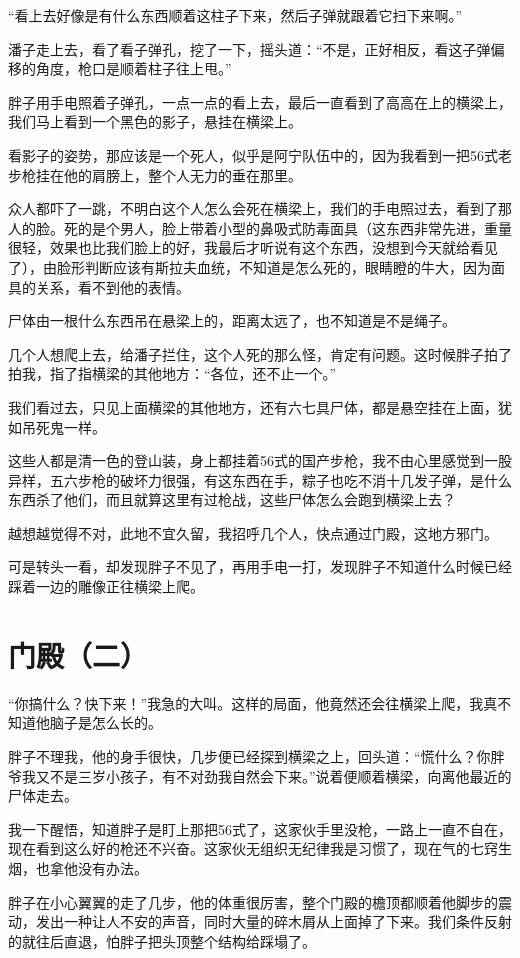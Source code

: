“看上去好像是有什么东西顺着这柱子下来，然后子弹就跟着它扫下来啊。”

潘子走上去，看了看子弹孔，挖了一下，摇头道：“不是，正好相反，看这子弹偏移的角度，枪口是顺着柱子往上甩。”

胖子用手电照着子弹孔，一点一点的看上去，最后一直看到了高高在上的横梁上，我们马上看到一个黑色的影子，悬挂在横梁上。

看影子的姿势，那应该是一个死人，似乎是阿宁队伍中的，因为我看到一把56式老步枪挂在他的肩膀上，整个人无力的垂在那里。

众人都吓了一跳，不明白这个人怎么会死在横梁上，我们的手电照过去，看到了那人的脸。死的是个男人，脸上带着小型的鼻吸式防毒面具（这东西非常先进，重量很轻，效果也比我们脸上的好，我最后才听说有这个东西，没想到今天就给看见了），由脸形判断应该有斯拉夫血统，不知道是怎么死的，眼睛瞪的牛大，因为面具的关系，看不到他的表情。

尸体由一根什么东西吊在悬梁上的，距离太远了，也不知道是不是绳子。

几个人想爬上去，给潘子拦住，这个人死的那么怪，肯定有问题。这时候胖子拍了拍我，指了指横梁的其他地方：“各位，还不止一个。”

我们看过去，只见上面横梁的其他地方，还有六七具尸体，都是悬空挂在上面，犹如吊死鬼一样。

这些人都是清一色的登山装，身上都挂着56式的国产步枪，我不由心里感觉到一股异样，五六步枪的破坏力很强，有这东西在手，粽子也吃不消十几发子弹，是什么东西杀了他们，而且就算这里有过枪战，这些尸体怎么会跑到横梁上去？

越想越觉得不对，此地不宜久留，我招呼几个人，快点通过门殿，这地方邪门。

可是转头一看，却发现胖子不见了，再用手电一打，发现胖子不知道什么时候已经踩着一边的雕像正往横梁上爬。

\chapter{门殿（二）}

“你搞什么？快下来！”我急的大叫。这样的局面，他竟然还会往横梁上爬，我真不知道他脑子是怎么长的。

胖子不理我，他的身手很快，几步便已经探到横梁之上，回头道：“慌什么？你胖爷我又不是三岁小孩子，有不对劲我自然会下来。”说着便顺着横梁，向离他最近的尸体走去。

我一下醒悟，知道胖子是盯上那把56式了，这家伙手里没枪，一路上一直不自在，现在看到这么好的枪还不兴奋。这家伙无组织无纪律我是习惯了，现在气的七窍生烟，也拿他没有办法。

胖子在小心翼翼的走了几步，他的体重很厉害，整个门殿的檐顶都顺着他脚步的震动，发出一种让人不安的声音，同时大量的碎木屑从上面掉了下来。我们条件反射的就往后直退，怕胖子把头顶整个结构给踩塌了。

